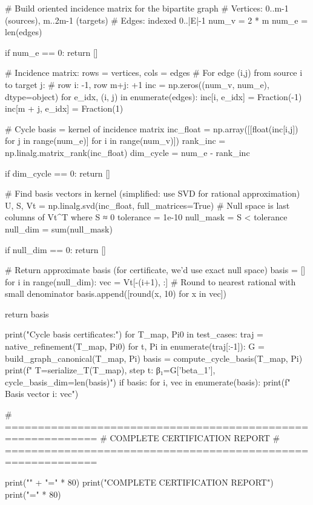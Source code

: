     # Build oriented incidence matrix for the bipartite graph
    # Vertices: 0..m-1 (sources), m..2m-1 (targets)
    # Edges: indexed 0..|E|-1
    num_v = 2 * m
    num_e = len(edges)
    
    if num_e == 0:
        return []
    
    # Incidence matrix: rows = vertices, cols = edges
    # For edge (i,j) from source i to target j:
    #   row i: -1, row m+j: +1
    inc = np.zeros((num_v, num_e), dtype=object)
    for e_idx, (i, j) in enumerate(edges):
        inc[i, e_idx] = Fraction(-1)
        inc[m + j, e_idx] = Fraction(1)
    
    # Cycle basis = kernel of incidence matrix
    inc_float = np.array([[float(inc[i,j]) for j in range(num_e)] for i in range(num_v)])
    rank_inc = np.linalg.matrix_rank(inc_float)
    dim_cycle = num_e - rank_inc
    
    if dim_cycle == 0:
        return []
    
    # Find basis vectors in kernel (simplified: use SVD for rational approximation)
    U, S, Vt = np.linalg.svd(inc_float, full_matrices=True)
    # Null space is last columns of Vt^T where S ≈ 0
    tolerance = 1e-10
    null_mask = S < tolerance
    null_dim = sum(null_mask)
    
    if null_dim == 0:
        return []
    
    # Return approximate basis (for certificate, we'd use exact null space)
    basis = []
    for i in range(null_dim):
        vec = Vt[-(i+1), :]
        # Round to nearest rational with small denominator
        basis.append([round(x, 10) for x in vec])
    
    return basis

print("\n  Cycle basis certificates:")
for T_map, Pi0 in test_cases:
    traj = native_refinement(T_map, Pi0)
    for t, Pi in enumerate(traj[:-1]):
        G = build_graph_canonical(T_map, Pi)
        basis = compute_cycle_basis(T_map, Pi)
        print(f"    T={serialize_T(T_map)}, step {t}: β₁={G['beta_1']}, cycle_basis_dim={len(basis)}")
        if basis:
            for i, vec in enumerate(basis):
                print(f"      Basis vector {i}: {vec}")

# ============================================================
# COMPLETE CERTIFICATION REPORT
# ============================================================

print("\n" + "=" * 80)
print("COMPLETE CERTIFICATION REPORT")
print("=" * 80)

